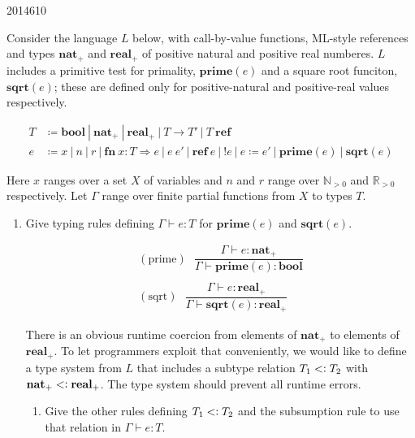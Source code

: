 \documentclass[10pt,\jkfside,a4paper]{article}
\begin{document}
\begin{examquestion}{2014}{6}{10}

Consider the language $L$ below, with call-by-value functions, ML-style
references and types $\mathbf{nat}_+$ and $\mathbf{real}_+$ of positive
natural and positive real numberes. $L$ includes a primitive test for
primality, $\mathbf{prime}(e)$ and a square root funciton, $\mathbf{sqrt}(e)
$; these are defined only for positive-natural and positive-real values
respectively.

\[
\begin{split}
T &\coloneqq \mathbf{bool} \ | \ \mathbf{nat}_+ \ | \ \mathbf{real}_+ \ | \ T
 \to T' \ | \ T \ \mathbf{ref} \\
e &\coloneqq x \ | \ n \ | \ r \ | \ \mathbf{fn} \ x : T \Rightarrow e \ | \ e
\ e'
\ | \ \mathbf{ref} \ e \ | \ !e \ | \ e \coloneqq e' \ | \ \mathbf{prime}(e) \
 | \ \mathbf{sqrt}(e)
\end{split}
\]

Here $x$ ranges over a set $X$ of variables and $n$ and $r$ range over
$\mathbb{N}_{> 0}$ and $\mathbb{R}_{>0}$ respectively. Let $\Gamma$ range
over finite partial functions from $X$ to types $T$.

\begin{enumerate}[label=(\alph*)]

\item Give typing rules defining $\Gamma \vdash  e : T$ for $\mathbf{prime}
(e)$ and $\mathbf{sqrt}(e)$.

\[
\begin{split}
(\text{prime}) \ \ \
\dfrac{
\Gamma \vdash e: \mathbf{nat}_+
}{
\Gamma \vdash \mathbf{prime}(e) : \mathbf{bool}
}\\\\
(\text{sqrt}) \ \ \
\dfrac{
\Gamma \vdash e: \mathbf{real}_+
}{
\Gamma \vdash \mathbf{sqrt}(e): \mathbf{real}_+
}
\end{split}
\]

There is an obvious runtime coercion from elements of $\mathbf{nat}_+$ to
elements of $\mathbf{real}_+$. To let programmers exploit that conveniently,
we would like to define a type system from $L$ that includes a subtype
relation $T_1 <\vcentcolon T_2$ with $\mathbf{nat}_+ <\vcentcolon \mathbf{real}_+$.
The type system should prevent all runtime errors.

\begin{enumerate}[label=(\roman*)]

\item Give the other rules defining $T_1 <\vcentcolon T_2$ and the subsumption rule to
use that relation in $\Gamma \vdash e: T$.


\end{enumerate}
\end{enumerate}
\end{examquestion}
\end{document}
